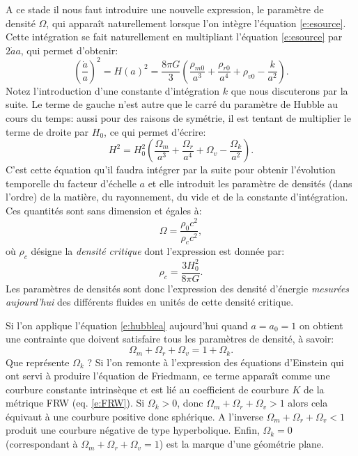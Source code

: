 A ce stade il nous faut introduire une nouvelle expression, le paramètre de densité $\Omega$, qui apparaît naturellement lorsque l'on intègre l'équation \ref{e:esource}. Cette intégration se fait naturellement en multipliant l'équation \ref{e:esource} par $2\dot a a$, qui permet d'obtenir:
\begin{equation}
\left(\frac{\dot a}{a}\right)^2=H(a)^2=\frac{8\pi G}{3}(\frac{\rho_{m0}}{a^3}+\frac{\rho_{r0}}{a^4}+\rho_{v0}-\frac{k}{a^2}).
\end{equation}
Notez l'introduction d'une constante d'intégration $k$ que nous discuterons par la suite. Le terme de gauche n'est autre que le carré du paramètre de Hubble au cours du temps: aussi pour des raisons de symétrie, il est tentant de multiplier le terme de droite par $H_0$, ce qui permet d'écrire:
\begin{equation}
H^2=H_0^2(\frac{\Omega_m}{a^3}+\frac{\Omega_r}{a^4}+\Omega_v-\frac{\Omega_k}{a^2}).
\label{e:hubblea}
\end{equation}
C'est cette équation qu'il faudra intégrer par la suite pour obtenir l'évolution temporelle du facteur d'échelle $a$ et elle introduit les paramètre de densités (dans l'ordre) de la matière, du rayonnement, du vide et de la constante d'intégration. Ces quantités sont sans dimension et égales à:
\begin{equation}
\Omega=\frac{\rho_0 c^2}{\rho_c c^2},
\end{equation}
où $\rho_c$ désigne la \textit{densité critique} dont l'expression est donnée par:
\begin{equation}
\rho_c=\frac{3H_0^2}{8\pi G}.
\end{equation}
Les paramètres de densités sont donc l'expression des densité d'énergie \textit{mesurées aujourd'hui} des différents fluides en unités de cette densité critique.

Si l'on applique l'équation \ref{e:hubblea} aujourd'hui quand $a=a_0=1$ on obtient une contrainte que doivent satisfaire tous les paramètres de densité, à savoir:
\begin{equation}
\Omega_m+\Omega_r+\Omega_v= 1+\Omega_k.
\end{equation}
Que représente $\Omega_k$ ? Si l'on remonte à l'expression des équations d'Einstein qui ont servi à produire l'équation de Friedmann, ce terme apparaît comme une courbure constante intrinsèque et est lié au coefficient de courbure $K$ de la métrique FRW (eq. \ref{e:FRW}). Si $\Omega_k>0$, donc $\Omega_m+\Omega_r+\Omega_v>1$ alors cela équivaut à une courbure positive donc sphérique. A l'inverse $\Omega_m+\Omega_r+\Omega_v<1$ produit une courbure négative de type hyperbolique. Enfin, $\Omega_k=0$  (correspondant à $\Omega_m+\Omega_r+\Omega_v=1$) est la marque d'une géométrie plane. 

